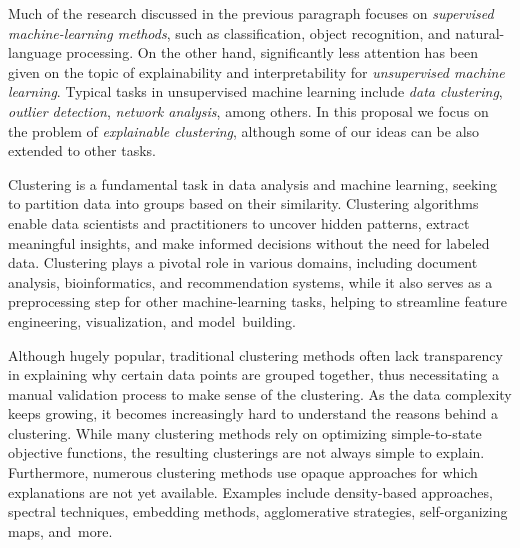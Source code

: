 \documentclass[a4paper,11pt]{article}
\begin{document}

Much of the research discussed in the previous paragraph focuses on \emph{supervised machine-learning methods}, 
such as classification, object recognition, and natural-language processing.
On the other hand, significantly less attention has been given on the 
topic of explainability and interpretability for \emph{unsupervised machine learning}.
Typical tasks in unsupervised machine learning include
\emph{data clustering}, \emph{outlier detection}, \emph{network analysis}, among others. 
In this proposal we focus on the problem of \emph{explainable clustering}, 
although some of our ideas can be also extended to other tasks.

Clustering is a fundamental task in data analysis and machine learning, 
seeking to partition data into groups based on their similarity.
Clustering algorithms enable data scientists and practitioners
to uncover hidden patterns, extract meaningful insights, 
and make informed decisions without the need for labeled data. 
Clustering plays a pivotal role in various domains, 
including  document analysis, bioinformatics, and recommendation systems, 
while it also serves as a preprocessing step for other machine-learning tasks, 
helping to streamline feature engineering, visualization, and model~building.

Although hugely popular, 
traditional clustering methods often lack transparency in explaining 
why certain data points are grouped together, 
thus necessitating a manual validation process to make sense of the clustering. 
As the data complexity keeps growing, 
it becomes increasingly hard to understand the reasons behind a clustering.
While many clustering methods rely on optimizing simple-to-state objective functions, 
the resulting clusterings are not always simple to explain. 
Furthermore, numerous clustering methods use opaque approaches
for which explanations are not yet available. 
Examples include density-based approaches, spectral techniques, embedding methods,  
agglomerative strategies, self-organizing maps, and~more.
\end{document}
